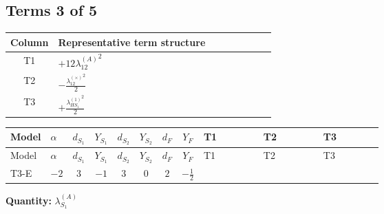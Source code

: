 \documentclass[8pt]{article}
\begin{document}
\begin{landscape}
\subsection*{Terms 3 of 5}
\begin{center}
\begin{tabular}{@{}c >{\raggedright\arraybackslash}p{0.82\linewidth}@{}}
\toprule
Column & Representative term structure \\
\midrule
T1 & \(\displaystyle +12 {\lambda_{12}^{(A)}}^2\) \\
\midrule
T2 & \(\displaystyle -\frac{{\lambda_{12}^{(\times)}}^2}{2}\) \\
\midrule
T3 & \(\displaystyle +\frac{{\lambda_{HS_1}^{(1)}}^2}{2}\) \\
\midrule
\bottomrule
\end{tabular}
\end{center}
\smallskip
\tiny
\begin{longtable}{@{}llcccccc >{\raggedright\arraybackslash}p{0.21\linewidth} >{\raggedright\arraybackslash}p{0.21\linewidth} >{\raggedright\arraybackslash}p{0.21\linewidth}@{}}
\toprule
Model & $\alpha$ & $d_{S_1}$ & $Y_{S_1}$ & $d_{S_2}$ & $Y_{S_2}$ & $d_F$ & $Y_F$ & T1 & T2 & T3 \\
\midrule
\endfirsthead
\toprule
Model & $\alpha$ & $d_{S_1}$ & $Y_{S_1}$ & $d_{S_2}$ & $Y_{S_2}$ & $d_F$ & $Y_F$ & T1 & T2 & T3 \\
\midrule
\endhead
T3-E & $-2$ & $3$ & $-1$ & $3$ & $0$ & $2$ & $-\frac{1}{2}$ & \scriptsize\adjustbox{max width=\linewidth}{$\begin{gathered} +12 {\lambda_{12}^{(A)}}^2\end{gathered}$} & \scriptsize\adjustbox{max width=\linewidth}{$\begin{gathered} -\frac{{\lambda_{12}^{(\times)}}^2}{2}\end{gathered}$} & \scriptsize\adjustbox{max width=\linewidth}{$\begin{gathered} +\frac{{\lambda_{HS_1}^{(1)}}^2}{2}\end{gathered}$} \\
\midrule
\bottomrule
\end{longtable}
\clearpage
\noindent\textbf{Quantity: }$\lambda_{S_1}^{(A)}$\par\smallskip

\end{landscape}
\end{document}
